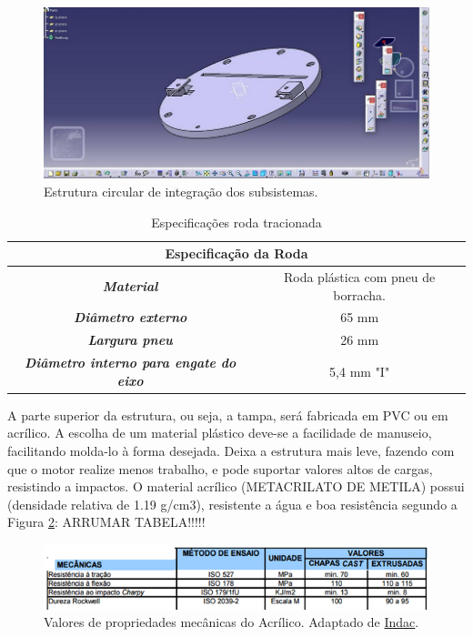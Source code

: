 			\begin{figure}[H]
				\centering
				\includegraphics[scale=0.5]{figuras/estrutura_circular.png}
				\caption{Estrutura circular de integração dos subsistemas.}
				\label{img:estrutura_circular}
			\end{figure}

			\begin{table}[H]
				\centering
				\caption{Especificações roda tracionada}
				\label{tab:especificacoes_roda}
				\begin{tabular}{|c|c|}
					\hline
					\multicolumn{2}{|c|}{\cellcolor[HTML]{C0C0C0}\textbf{Especificação da Roda}}                 \\ \hline
					\textit{\textbf{Material}}                             & Roda plástica com pneu de borracha. \\ \hline
					\textit{\textbf{Diâmetro externo}}                     & 65 mm                               \\ \hline
					\textit{\textbf{Largura pneu}}                         & 26 mm                               \\ \hline
					\textit{\textbf{Diâmetro interno para engate do eixo}} & 5,4 mm "I"                          \\ \hline
				\end{tabular}
			\end{table}

			A parte superior da estrutura, ou seja, a tampa, será fabricada em PVC ou em acrílico. A escolha de um material plástico deve-se a facilidade de manuseio, facilitando molda-lo à forma desejada. Deixa a estrutura mais leve, fazendo com que o motor realize menos trabalho, e pode suportar valores altos de cargas, resistindo a impactos. O material acrílico (METACRILATO DE METILA) possui (densidade relativa de 1.19 g/cm3), resistente a água e boa resistência segundo a Figura \ref{img:acrilico}:
			ARRUMAR TABELA!!!!!
			\begin{figure}[H]
				\centering
				\includegraphics[scale=0.8]{figuras/tabela_acrilico.png}
				\caption[Valores de propriedades mecânicas do Acrílico]{Valores de propriedades mecânicas do Acrílico. Adaptado de \href{http://www.indac.org.br/arquivos/acrilico\_indac.pdf}{Indac}.}
				\label{img:acrilico}
			\end{figure}

